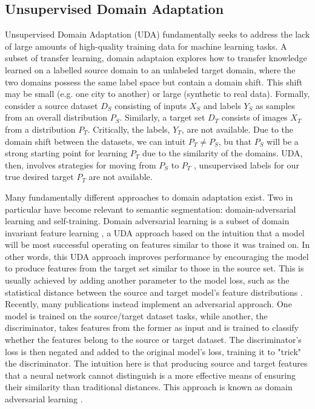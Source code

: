 \documentclass[a4paper,12pt]{report}
\begin{document}
\subsection{Unsupervised Domain Adaptation}
Unsupervised Domain Adaptation (UDA) fundamentally seeks to address the lack of large amounts of high-quality training data for machine learning tasks. A subset of transfer learning, domain adaptaion explores how to transfer knowledge learned on a labelled source domain to an unlabeled target domain, where the two domains possess the same label space but contain a domain shift. This shift may be small (e.g. one city to another) or large (synthetic to real data). Formally, consider a source dataset $D_S$ consisting of inputs $X_S$ and labels $Y_S$ as samples from an overall distribution $P_S$. Similarly, a target set $D_T$ consists of images $X_T$ from a distribution $P_T$. Critically, the labels, $Y_T$, are not available. Due to the domain shift between the datasets, we can intuit $P_T \neq P_S$, bu that  $P_S$ will be a strong starting point for learning $P_T$ due to the similarity of the domains. UDA, then, involves strategies for moving from $P_S$ to $P_T$ \cite{wilson_survey_2020}, unsupervised labels for our true desired target $P_T$ are not available.

Many fundamentally different approaches to domain adaptation exist. Two in particular have become relevant to semantic segmentation: domain-adversarial learning and self-training. Domain adversarial learning is a subset of domain invariant feature learning \cite{wilson_survey_2020}, a UDA approach based on the intuition that a model will be most successful operating on features similar to those it was trained on. In other words, this UDA approach improves performance by encouraging the model to produce features from the target set similar to those in the source set. This is usually achieved by adding another parameter to the model loss, such as the statistical distance between the source and target model's feature distributions \cite{gretton_kernel_2006} \cite{sun_return_2015}. Recently, many publications instead implement an adversarial \cite{goodfellow_generative_2014} approach. One model is trained on the source/target dataset tasks, while another, the discriminator, takes features from the former as input and is trained to classify whether the features belong to the source or target dataset. The discriminator's loss is then negated and added to the original model's loss, training it to "trick" the discriminator. The intuition here is that producing source and target features that a neural network cannot distinguish is a more effective means of ensuring their similarity than traditional distances. This approach is known as domain adversarial learning \cite{ganin_domain-adversarial_2016}.
\end{document}

